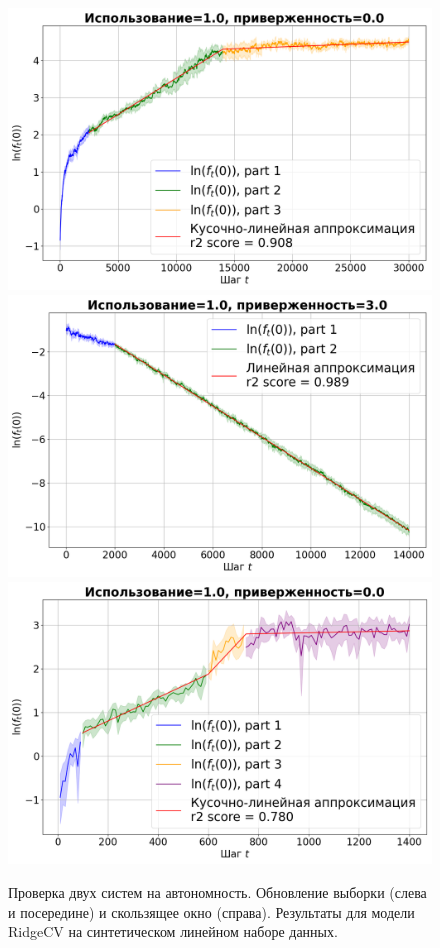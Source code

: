    \begin{figure}[h!]
        \centering
        \includegraphics[width=0.32\linewidth]{pictures/aut_su_synthetic_ridgecv_model_1.0_0.0.png}
        \includegraphics[width=0.32\linewidth]{pictures/aut_su_synthetic_ridgecv_model_1.0_3.0.png}
        \includegraphics[width=0.32\linewidth]{pictures/aut_sw_synthetic_ridgecv_model_1.0_0.0.png}
        
        \caption{Проверка двух систем на автономность. Обновление выборки (слева и посередине) и скользящее окно (справа). Результаты для модели RidgeCV на синтетическом линейном наборе данных.}
        \label{fig_exp_4_3}
    \end{figure}

